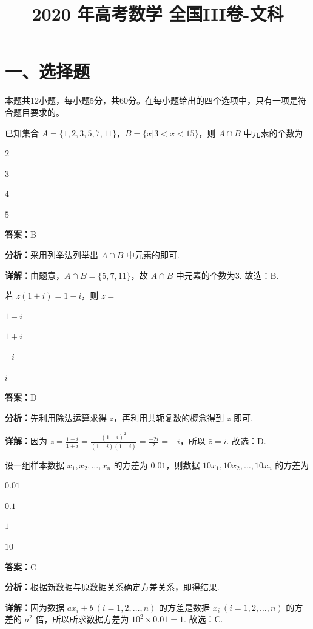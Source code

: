 ﻿\title{2020 年高考数学 全国III卷-文科}
\date{}
\maketitle

\section*{一、选择题}
本题共12小题，每小题5分，共60分。在每小题给出的四个选项中，只有一项是符合题目要求的。

\begin{question}[points=5]
已知集合 $A=\{1,2,3,5,7,11\}$，$B=\{x|3<x<15\}$，则 $A\cap B$ 中元素的个数为
\begin{choices}
  \item $2$
  \item $3$
  \item $4$
  \item $5$
\end{choices}
\begin{solution}
\textbf{答案：}B

\textbf{分析：}采用列举法列举出 $A\cap B$ 中元素的即可.

\textbf{详解：}由题意，$A\cap B=\{5,7,11\}$，故 $A\cap B$ 中元素的个数为3. 故选：B.
\end{solution}
\end{question}

\begin{question}[points=5]
若 $z(1+i)=1-i$，则 $z=$
\begin{choices}
  \item $1-i$
  \item $1+i$
  \item $-i$
  \item $i$
\end{choices}
\begin{solution}
\textbf{答案：}D

\textbf{分析：}先利用除法运算求得 $z$，再利用共轭复数的概念得到 $z$ 即可.

\textbf{详解：}因为 $z=\frac{1-i}{1+i}=\frac{(1-i)^2}{(1+i)(1-i)}=\frac{-2i}{2}=-i$，所以 $\bar{z}=i$. 故选：D.
\end{solution}
\end{question}

\begin{question}[points=5]
设一组样本数据 $x_1,x_2,\dots,x_n$ 的方差为 $0.01$，则数据 $10x_1,10x_2,\dots,10x_n$ 的方差为
\begin{choices}
  \item $0.01$
  \item $0.1$
  \item $1$
  \item $10$
\end{choices}
\begin{solution}
\textbf{答案：}C

\textbf{分析：}根据新数据与原数据关系确定方差关系，即得结果.

\textbf{详解：}因为数据 $ax_i+b\ (i=1,2,\dots,n)$ 的方差是数据 $x_i\ (i=1,2,\dots,n)$ 的方差的 $a^2$ 倍，所以所求数据方差为 $10^2\times0.01=1$. 故选：C.
\end{solution}
\end{question}

